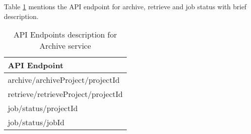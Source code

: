     Table \ref{table:archiveEndpoints} mentions the API endpoint for archive, retrieve and job status with brief description.
    \begin{table}[H]
        \centering
        \begin{tabular}{|p{6cm}|}
            \hline
                \textbf{API Endpoint}\\
            \hline
                archive/archiveProject/{{projectId}} \\
            \hline
                retrieve/retrieveProject/{{projectId}} \\
            \hline
                job/status/{{projectId}} \\
            \hline
                job/status/{{jobId}} \\
            \hline
        \end{tabular}
        \caption{API Endpoints description for Archive service}
        \label{table:archiveEndpoints}     
    \end{table}   


    
